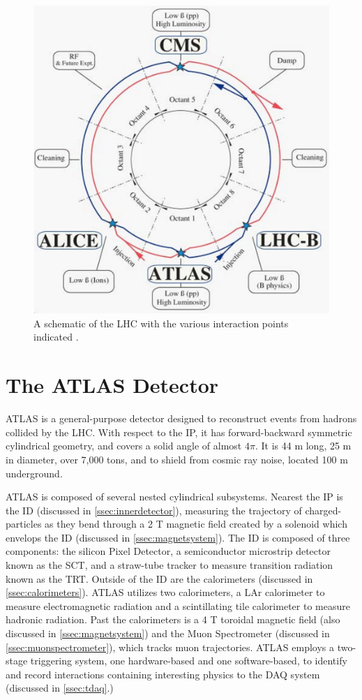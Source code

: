 \begin{figure}[!ht]
    \centering
    \includegraphics[width=.7\textwidth]{chapters/chapter2_experiment/images/lhc_interaction_points.png}
    \caption{A schematic of the LHC with the various interaction points indicated \cite{lhc}.}
    \label{fig:lhc}
\end{figure}


\section{The ATLAS Detector}

ATLAS \cite{atlas-experiment} is a general-purpose detector designed to reconstruct events from hadrons collided by the \gls{LHC}. With respect to the \gls{IP}, it has forward-backward symmetric cylindrical geometry, and covers a solid angle of almost $4\pi$. It is 44 m long, 25 m in diameter, over 7,000 tons, and to shield from cosmic ray noise, located 100 m underground. 

ATLAS is composed of several nested cylindrical subsystems. Nearest the \gls{IP} is the \gls{ID} (discussed in \ref{ssec:innerdetector}), measuring the trajectory of charged-particles as they bend through a 2 T magnetic field created by a solenoid which envelops the \gls{ID} (discussed in \ref{ssec:magnetsystem}). The \gls{ID} is composed of three components: the silicon Pixel Detector, a semiconductor microstrip detector known as the \gls{SCT}, and a straw-tube tracker to measure transition radiation known as the \gls{TRT}. Outside of the \gls{ID} are the calorimeters (discussed in \ref{ssec:calorimeters}). ATLAS utilizes two calorimeters, a \gls{LAr} calorimeter to measure electromagnetic radiation and a scintillating tile calorimeter to measure hadronic radiation. Past the calorimeters is a 4 T toroidal magnetic field (also discussed in \ref{ssec:magnetsystem}) and the Muon Spectrometer (discussed in \ref{ssec:muonspectrometer}), which tracks muon trajectories. ATLAS employs a two-stage triggering system, one hardware-based and one software-based, to identify and record interactions containing interesting physics to the \gls{DAQ} system (discussed in \ref{ssec:tdaq}.)

